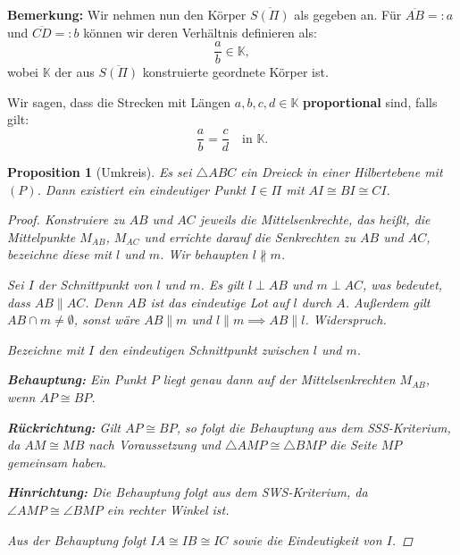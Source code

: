 \documentclass[a4paper,12pt]{article}
\theoremstyle{break}
\newtheorem{proposition}[definition]{Proposition}
\begin{document}
\textbf{Bemerkung:}
Wir nehmen nun den Körper \(\overline{S(\Pi)}\) als gegeben an. Für \(\overline{AB} =: a\) und \(\overline{CD} =: b\) können wir deren Verhältnis definieren als:
\[
\frac{a}{b} \in \mathbb{K},
\]
wobei \(\mathbb{K}\) der aus \(\overline{S(\Pi)}\) konstruierte geordnete Körper ist.

Wir sagen, dass die Strecken mit Längen \(a, b, c, d \in \mathbb{K}\) \textbf{proportional} sind, falls gilt:
\[
\frac{a}{b} = \frac{c}{d} \quad \text{in } \mathbb{K}.
\]

\begin{proposition}[Umkreis]\label{prop:umkreis}
Es sei \(\triangle ABC\) ein Dreieck in einer Hilbertebene mit \((P)\). Dann existiert ein eindeutiger Punkt \(I \in \Pi\) mit \(AI \cong BI \cong CI\).

\begin{proof}
Konstruiere zu \(AB\) und \(AC\) jeweils die Mittelsenkrechte, das heißt, die Mittelpunkte \(M_{AB}\), \(M_{AC}\) und errichte darauf die Senkrechten zu \(AB\) und \(AC\), bezeichne diese mit \(l\) und \(m\). Wir behaupten \(l \nparallel m\).

Sei \(I\) der Schnittpunkt von \(l\) und \(m\). Es gilt \(l \perp AB\) und \(m \perp AC\), was bedeutet, dass \(AB \parallel AC\). Denn \(AB\) ist das eindeutige Lot auf \(l\) durch \(A\). Außerdem gilt \(AB \cap m \neq \emptyset\), sonst wäre \(AB \parallel m\) und \(l \parallel m \implies AB \parallel l\). Widerspruch.

Bezeichne mit \(I\) den eindeutigen Schnittpunkt zwischen \(l\) und \(m\).

\textbf{Behauptung:} Ein Punkt \(P\) liegt genau dann auf der Mittelsenkrechten \(M_{AB}\), wenn \(AP \cong BP\).

\textbf{Rückrichtung:} Gilt \(AP \cong BP\), so folgt die Behauptung aus dem \textit{SSS}-Kriterium, da \(AM \cong MB\) nach Voraussetzung und \(\triangle AMP \cong \triangle BMP\) die Seite \(MP\) gemeinsam haben.

\textbf{Hinrichtung:} Die Behauptung folgt aus dem \textit{SWS}-Kriterium, da \(\angle AMP \cong \angle BMP\) ein rechter Winkel ist.

Aus der Behauptung folgt \(IA \cong IB \cong IC\) sowie die Eindeutigkeit von \(I\).
\end{proof}
\end{proposition}
\end{document}
